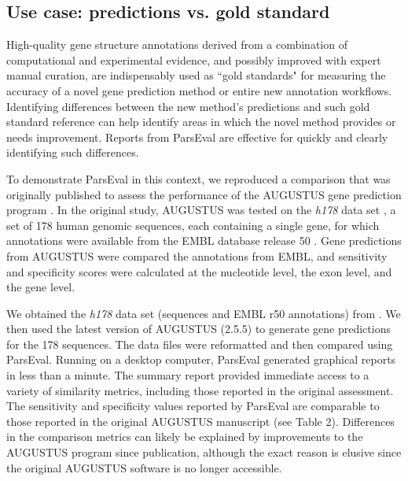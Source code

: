 \subsection{Use case: predictions vs. gold standard}
High-quality gene structure annotations derived from a combination of computational and experimental evidence, and possibly improved with expert manual curation, are indispensably used as ``gold standards" for measuring the accuracy of a novel gene prediction method or entire new annotation workflows.
Identifying differences between the new method's predictions and such gold standard reference can help identify areas in which the novel method provides or needs improvement.
Reports from ParsEval are effective for quickly and clearly identifying such differences.

To demonstrate ParsEval in this context, we reproduced a comparison that was originally published to assess the performance of the AUGUSTUS gene prediction program  \citep{Stanke2003}.
In the original study, AUGUSTUS was tested on the \emph{h178} data set \citep{Guigo2000}, a set of 178 human genomic sequences, each containing a single gene, for which annotations were available from the EMBL database release 50 \citep{embl}.
Gene predictions from AUGUSTUS were compared the annotations from EMBL, and sensitivity and specificity scores were calculated at the nucleotide level, the exon level, and the gene level.

We obtained the \emph{h178} data set (sequences and EMBL r50 annotations) from  \citep{imim}.
We then used the latest version of AUGUSTUS (2.5.5) to generate gene predictions for the 178 sequences.
The data files were reformatted and then compared using ParsEval.
Running on a desktop computer, ParsEval generated graphical reports in less than a minute.
The summary report provided immediate access to a variety of similarity metrics, including those reported in the original assessment.
The sensitivity and specificity values reported by ParsEval are comparable to those reported in the original AUGUSTUS manuscript (see Table 2).
Differences in the comparison metrics can likely be explained by improvements to the AUGUSTUS program since publication, although the exact reason is elusive since the original AUGUSTUS software is no longer accessible.


